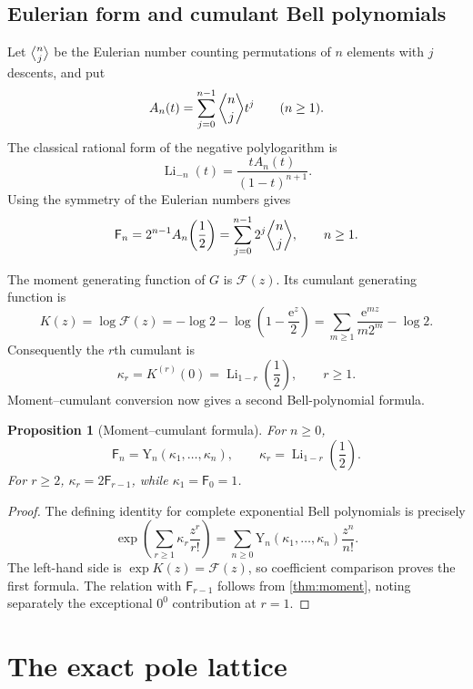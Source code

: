 \documentclass[11pt,a4paper,oneside]{article}
\newtheorem{proposition}[theorem]{Proposition}
\theoremstyle{definition}
\theoremstyle{remark}
\newcommand{\Fub}{\mathsf{F}}
\newcommand{\Eulerian}[2]{\genfrac{\langle}{\rangle}{0pt}{}{#1}{#2}}
\newcommand{\Li}{\operatorname{Li}}
\newcommand{\e}{\mathrm{e}}
\newcommand{\BellY}{\mathrm{Y}}
\begin{document}
\subsection{Eulerian form and cumulant Bell polynomials}
Let $\Eulerian{n}{j}$ be the Eulerian number counting
permutations of $n$ elements with $j$ descents, and put
\[
 A_n(t)=\sum_{j=0}^{n-1}\Eulerian{n}{j} t^j
 \qquad(n\ge1).
\]
The classical rational form of the negative polylogarithm is
\[
 \Li_{-n}(t)=\frac{tA_n(t)}{(1-t)^{n+1}}.
\]
Using the symmetry of the Eulerian numbers gives
\begin{equation}\label{eq:eulerian-form}
 \Fub_n=2^{n-1}A_n\!\left(\frac12\right)
 =\sum_{j=0}^{n-1}2^j\Eulerian{n}{j},
 \qquad n\ge1.
\end{equation}

The moment generating function of $G$ is $\mathcal F(z)$.  Its cumulant
generating function is
\[
 K(z)=\log\mathcal F(z)
 =-\log2-\log\!\left(1-\frac{\e^z}{2}\right)
 =\sum_{m\ge1}\frac{\e^{mz}}{m2^m}-\log2.
\]
Consequently the $r$th cumulant is
\begin{equation}\label{eq:cumulants}
 \kappa_r=K^{(r)}(0)=\Li_{1-r}\!\left(\frac12\right),
 \qquad r\ge1.
\end{equation}
Moment--cumulant conversion now gives a second Bell-polynomial formula.

\begin{proposition}[Moment--cumulant formula]\label{prop:moment-cumulant}
For $n\ge0$,
\[
 \Fub_n=\BellY_n(\kappa_1,\ldots,\kappa_n),
 \qquad
 \kappa_r=\Li_{1-r}\!\left(\frac12\right).
\]
For $r\ge2$, $\kappa_r=2\Fub_{r-1}$, while $\kappa_1=\Fub_0=1$.
\end{proposition}

\begin{proof}
The defining identity for complete exponential Bell polynomials is precisely
\[
 \exp\!\left(\sum_{r\ge1}\kappa_r\frac{z^r}{r!}\right)
 =\sum_{n\ge0}\BellY_n(\kappa_1,\ldots,\kappa_n)\frac{z^n}{n!}.
\]
The left-hand side is $\exp K(z)=\mathcal F(z)$, so coefficient comparison
proves the first formula.  The relation with $\Fub_{r-1}$ follows from
\cref{thm:moment}, noting separately the exceptional $0^0$ contribution at
$r=1$.
\end{proof}


\section{The exact pole lattice}\label{sec:poles}
\end{document}
